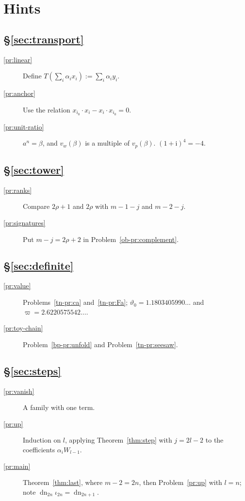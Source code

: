 \documentclass[reqno]{amsart}
\theoremstyle{definition}
\theoremstyle{plain}
\theoremstyle{remark}
\newcommand{\dn}{\operatorname{dn}}
\begin{document}
\section*{Hints}

\subsection*{\S\ref{sec:transport}}
\begin{description}
\item[\ref{pr:linear}] Define \(T(\sum_i\alpha_ix_i):=\sum_i\alpha_iy_i\).
\item[\ref{pr:anchor}] Use the relation \(x_{i_0}\cdot x_i-x_i\cdot x_{i_0}=0\).
\item[\ref{pr:unit-ratio}] \(a^n=\beta\), and \(v_w(\beta)\) is a multiple of \(v_p(\beta)\).  \((1+\mathrm i)^4=-4\).
\end{description}

\subsection*{\S\ref{sec:tower}}
\begin{description}
\item[\ref{pr:ranks}] Compare \(2\rho+1\) and \(2\rho\) with \(m-1-j\) and \(m-2-j\).
\item[\ref{pr:signatures}] Put \(m-j=2\rho+2\) in Problem~\ref{ob-pr:complement}.
\end{description}

\subsection*{\S\ref{sec:definite}}
\begin{description}
\item[\ref{pr:value}] Problems~\ref{tn-pr:ca} and~\ref{tn-pr:Fa}; \(\vartheta_0=1.1803405990\ldots\) and \(\varpi=2.6220575542\ldots\).
\item[\ref{pr:toy-chain}] Problem~\ref{bp-pr:unfold} and Problem~\ref{tn-pr:seesaw}.
\end{description}

\subsection*{\S\ref{sec:steps}}
\begin{description}
\item[\ref{pr:vanish}] A family with one term.
\item[\ref{pr:up}] Induction on \(l\), applying Theorem~\ref{thm:step} with \(j=2l-2\) to the coefficients \(\alpha_iW_{l-1}\).
\item[\ref{pr:main}] Theorem~\ref{thm:last}, where \(m-2=2n\), then Problem~\ref{pr:up} with \(l=n\); note \(\dn_{2n}\iota_{2n}=\dn_{2n+1}\).
\end{description}
\end{document}
